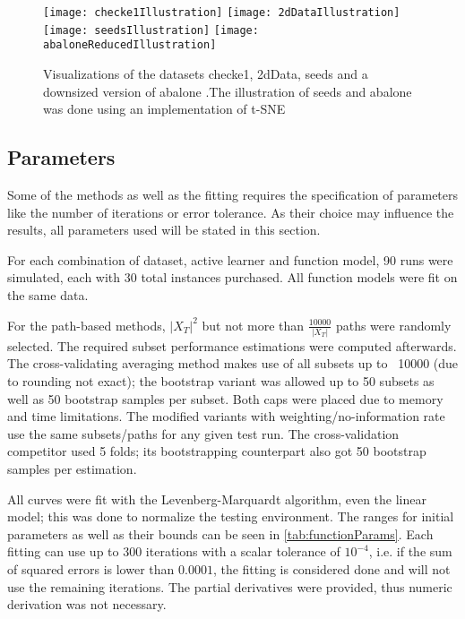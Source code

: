 \begin{figure}[h]
	\centering
	\texttt{[image: checke1Illustration]}
	\texttt{[image: 2dDataIllustration]}
	\texttt{[image: seedsIllustration]}
	\texttt{[image: abaloneReducedIllustration]}
	\caption{Visualizations of the datasets checke1, 2dData, seeds and a downsized version of abalone \cite{Chapelle2005,KremplEtAl2014,CharytanowiczEtAl2010,NashEtAl1994}.\newline The illustration of seeds and abalone was done using an implementation of t-SNE \cite{vanDerMaaten2008}}
	\label{fig:datasetIllustrations}
\end{figure}

\subsection{Parameters}

Some of the methods as well as the fitting requires the specification of parameters like the number of iterations or error tolerance. As their choice may influence the results, all parameters used will be stated in this section.

For each combination of dataset, active learner and function model, 90 runs were simulated, each with 30 total instances purchased. All function models were fit on the same data.

For the path-based methods, $|X_T|^2$ but not more than $\frac{10000}{|X_T|}$ paths were randomly selected. The required subset performance estimations were computed afterwards. The cross-validating averaging method makes use of all subsets up to ~10000 (due to rounding not exact); the bootstrap variant was allowed up to 50 subsets as well as 50 bootstrap samples per subset. Both caps were placed due to memory and time limitations. The modified variants with weighting/no-information rate use the same subsets/paths for any given test run. The cross-validation competitor used 5 folds; its bootstrapping counterpart also got 50 bootstrap samples per estimation.

All curves were fit with the Levenberg-Marquardt algorithm, even the linear model; this was done to normalize the testing environment. The ranges for initial parameters as well as their bounds can be seen in \ref{tab:functionParams}. Each fitting can use up to 300 iterations with a scalar tolerance of $10^{-4}$, i.e. if the sum of squared errors is lower than $0.0001$, the fitting is considered done and will not use the remaining iterations. The partial derivatives were provided, thus numeric derivation was not necessary.

